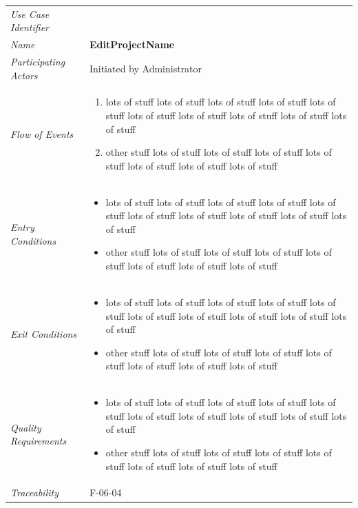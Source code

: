 \documentclass[12pt,letterpaper]{article}
\begin{document}
\begin{center}
	\begin{tabu} to 
		\toprule
		Use Case Identifier & \editprojectname{} \\
		Name & {\bf EditProjectName} \\
		Participating Actors & Initiated by Administrator \\
		Flow of Events & 
	    \begin{enumerate}[topsep=-1em]
		    \item lots of stuff lots of stuff lots of stuff lots of stuff lots of stuff lots of stuff lots of stuff lots of stuff lots of stuff lots of stuff
		    \item other stuff lots of stuff lots of stuff lots of stuff lots of stuff lots of stuff lots of stuff lots of stuff
		\end{enumerate} \\

		Entry Conditions &
		\begin{itemize}[topsep=-1em]
		    \item lots of stuff lots of stuff lots of stuff lots of stuff lots of stuff lots of stuff lots of stuff lots of stuff lots of stuff lots of stuff
		    \item other stuff lots of stuff lots of stuff lots of stuff lots of stuff lots of stuff lots of stuff lots of stuff
        \end{itemize} \\

		Exit Conditions &
		\begin{itemize}[topsep=-1em]
		    \item lots of stuff lots of stuff lots of stuff lots of stuff lots of stuff lots of stuff lots of stuff lots of stuff lots of stuff lots of stuff
		    \item other stuff lots of stuff lots of stuff lots of stuff lots of stuff lots of stuff lots of stuff lots of stuff
        \end{itemize} \\

		Quality Requirements &
		\begin{itemize}[topsep=-1em]
		    \item lots of stuff lots of stuff lots of stuff lots of stuff lots of stuff lots of stuff lots of stuff lots of stuff lots of stuff lots of stuff
		    \item other stuff lots of stuff lots of stuff lots of stuff lots of stuff lots of stuff lots of stuff lots of stuff
        \end{itemize} \\

		Traceability & F-06-04 \\
		\toprule
	\end{tabu}
\end{center}
\end{document}
